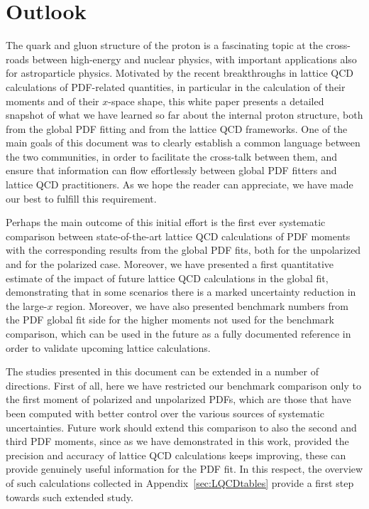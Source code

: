 \section{Outlook}
\label{sec:outlook}

The quark and gluon structure of the proton is a fascinating topic
at the cross-roads between high-energy and nuclear physics, with important
applications also for astroparticle physics.
%
Motivated by the recent breakthroughs in lattice QCD calculations of
PDF-related quantities, in particular in the calculation of their moments and of
their $x$-space shape, this white paper presents a detailed snapshot of what we have learned so far
about the internal proton structure, both from the global PDF fitting and from
the lattice QCD frameworks.
%
One of the main goals of this document was to clearly establish a common language
between the two communities, in order to facilitate the cross-talk between them,
and ensure that information can flow effortlessly between global PDF fitters
and lattice QCD practitioners.
%
As we hope the reader can appreciate, we have made our best to fulfill this requirement.

Perhaps the main outcome of this initial effort is the first ever systematic
comparison between state-of-the-art lattice QCD calculations of PDF moments with
the corresponding results from the global PDF fits, both
for the unpolarized and for the polarized case.
%
Moreover, we have presented a first quantitative estimate of the impact
of future lattice QCD calculations in the global fit, demonstrating that
in some scenarios there is a marked uncertainty reduction in the large-$x$ region.
%
Moreover, we have also presented benchmark numbers
from the PDF global fit side for the higher moments not used
for the benchmark comparison, which can be used
in the future as a fully documented
reference in order to validate upcoming lattice calculations.

The studies presented in this document can be extended in a number of directions.
%
First of all, here we have restricted our benchmark comparison only to the
first moment of polarized and unpolarized PDFs, which are those
that have been computed with better control over the various sources of
systematic uncertainties.
%
Future work should extend this comparison to also the second and third PDF moments,
since as we have demonstrated in this work, provided the precision and accuracy
of lattice QCD calculations keeps improving, these can provide genuinely
useful information for the PDF fit.
%
In this respect, the overview of such calculations collected in Appendix~\ref{sec:LQCDtables}
provide a first step towards such extended study.

